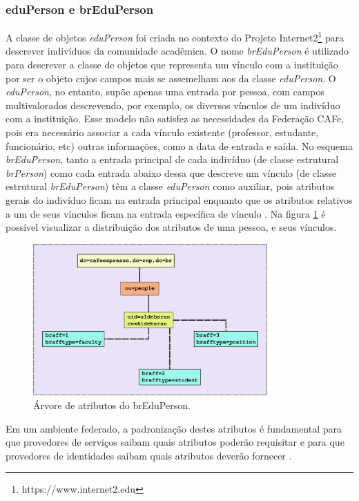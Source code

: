 \subsubsection{eduPerson e brEduPerson}
A classe de objetos \textit{eduPerson} foi criada no contexto do Projeto Internet2\footnote{https://www.internet2.edu} para descrever indivíduos da comunidade acadêmica. O nome \textit{brEduPerson} é utilizado para descrever a classe de objetos que representa um vínculo com a instituição por ser o objeto cujos campos mais se assemelham aos da classe \textit{eduPerson}. O \textit{eduPerson}, no entanto, supõe apenas uma entrada por pessoa, com campos multivalorados descrevendo, por exemplo, os diversos vínculos de um indivíduo com a instituição. Esse modelo não satisfez as necessidades da Federação CAFe, pois era necessário associar a cada vínculo existente (professor, estudante, funcionário, etc) outras informações, como a data de entrada e saída. No esquema \textit{brEduPerson}, tanto a entrada principal de cada indivíduo (de classe estrutural \textit{brPerson}) como cada entrada abaixo dessa que descreve um vínculo (de classe estrutural \textit{brEduPerson}) têm a classe \textit{eduPerson} como auxiliar, 
pois atributos gerais do indivíduo ficam na entrada principal enquanto que os atributos relativos a um de seus vínculos ficam na entrada específica de vínculo \cite{rnp:09}. Na figura \ref{fig_4} é possível visualizar a distribuição dos atributos de uma pessoa, e seus vínculos.

\begin{figure}[!htpb]
 \centering
 \includegraphics[width=0.8\textwidth]{figuras/arvore-breduperson.png}
 \caption{Árvore de atributos do brEduPerson.}
 \label{fig_4}
\end{figure}

Em um ambiente federado, a padronização destes atributos é fundamental para que provedores de serviços saibam quais atributos poderão requisitar e para que provedores de identidades saibam quais atributos deverão fornecer \cite{wangham:10a}.

